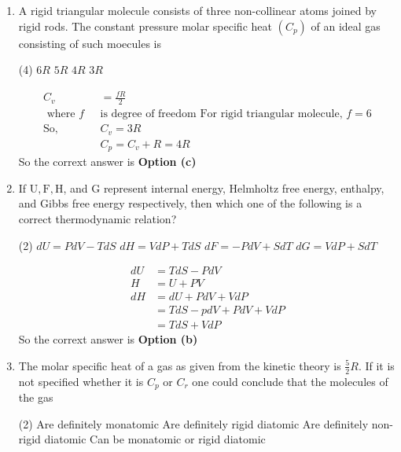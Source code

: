 \begin{enumerate}
\begin{answer}
\end{answer}
\item A rigid triangular molecule consists of three non-collinear atoms joined by rigid rods. The constant pressure molar specific heat $\left(C_{p}\right)$ of an ideal gas consisting of such moecules is
 \begin{tasks}(4)
	\task[\textbf{a.}] $6 R$
	\task[\textbf{b.}]$5 R$
	\task[\textbf{c.}] $4 R$
	\task[\textbf{d.}] $3 R$
\end{tasks}
\begin{answer}
	$$
	\begin{aligned}
	C_{v}&=\frac{f R}{2}\\
\text{	where $f$ }&\text{is degree of freedom
	For rigid triangular molecule, $f=6$}\\
\text{So,}\quad 
&C_{v}=3 R \\
&C_{p}=C_{v}+R=4 R
\end{aligned}
$$
So the corrext answer is \textbf{Option (c)}
\end{answer}
\item If $\mathrm{U}, \mathrm{F}, \mathrm{H}$, and $\mathrm{G}$ represent internal energy, Helmholtz free energy, enthalpy, and Gibbs free energy
respectively, then which one of the following is a correct thermodynamic relation?
 \begin{tasks}(2)
	\task[\textbf{a.}]$d U=P d V-T d S$
	\task[\textbf{b.}] $d H=V d P+T d S$
	\task[\textbf{c.}]$d F=-P d V+S d T$
	\task[\textbf{d.}]  $d G=V d P+S d T$
\end{tasks}
\begin{answer}
	$$
	\begin{aligned}
	d U &=T d S-P d V \\
	H &=U+P V \\
	d H &=d U+P d V+V d P \\
	&=T d S-p d V+P d V+V d P \\
	&=T d S+V d P
\end{aligned}
$$
So the corrext answer is \textbf{Option (b)}
\end{answer}
\item The molar specific heat of a gas as given from the kinetic theory is $\frac{5}{2} R$. If it is not specified whether it is $C_{p}$ or $C_{r}$ one could conclude that the molecules of the gas
 \begin{tasks}(2)
	\task[\textbf{a.}]Are definitely monatomic
	\task[\textbf{b.}]Are definitely rigid diatomic
	\task[\textbf{c.}]Are definitely non-rigid diatomic
	\task[\textbf{d.}]Can be monatomic or rigid diatomic

\end{tasks}
\end{enumerate}
